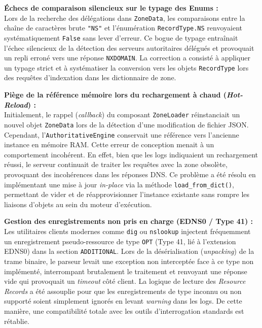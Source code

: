 \textbf{Échecs de comparaison silencieux sur le typage des Enums :}\\
Lors de la recherche des délégations dans \texttt{ZoneData}, les comparaisons entre la chaîne de caractères brute \texttt{"NS"} et l'énumération \texttt{RecordType.NS} renvoyaient systématiquement \texttt{False} sans lever d'erreur.
Ce bogue de typage entraînait l'échec silencieux de la détection des serveurs autoritaires délégués et provoquait un repli erroné vers une réponse \texttt{NXDOMAIN}.
La correction a consisté à appliquer un typage strict et à systématiser la conversion vers les objets \texttt{RecordType} lors des requêtes d'indexation dans les dictionnaire de zone.

\textbf{Piège de la référence mémoire lors du rechargement à chaud (\textit{Hot-Reload}) :}\\
Initialement, le rappel (\textit{callback}) du composant \texttt{ZoneLoader} réinstanciait un nouvel objet \texttt{ZoneData} lors de la détection d'une modification de fichier JSON.
Cependant, l'\texttt{AuthoritativeEngine} conservait une référence vers l'ancienne instance en mémoire RAM.
Cette erreur de conception menait à un comportement incohérent.
En effet, bien que les logs indiquaient un rechargement réussi, le serveur continuait de traiter les requêtes avec la zone obsolète, provoquant des incohérences dans les réponses DNS.
Ce problème a été résolu en implémentant une mise à jour \textit{in-place} via la méthode \texttt{load\_from\_dict()}, permettant de vider et de réapprovisionner l'instance existante sans rompre les liaisons d'objets au sein du moteur d'exécution.

\textbf{Gestion des enregistrements non pris en charge (EDNS0 / Type 41) :}\\
Les utilitaires clients modernes comme \texttt{dig} ou \texttt{nslookup} injectent fréquemment un enregistrement pseudo-ressource de type \texttt{OPT} (Type 41, lié à l'extension EDNS0) dans la section \texttt{ADDITIONAL}. Lors de la désérialisation (\textit{unpacking}) de la trame binaire, le parseur levait une exception non interceptée face à ce type non implémenté, interrompant brutalement le traitement et renvoyant une réponse vide qui provoquait un \textit{timeout} côté client.
La logique de lecture des \textit{Resource Records} a été assouplie pour que les enregistrements de type inconnu ou non supporté soient simplement ignorés en levant \textit{warning} dans les logs.
De cette manière, une compatibilité totale avec les outils d'interrogation standards est rétablie.

